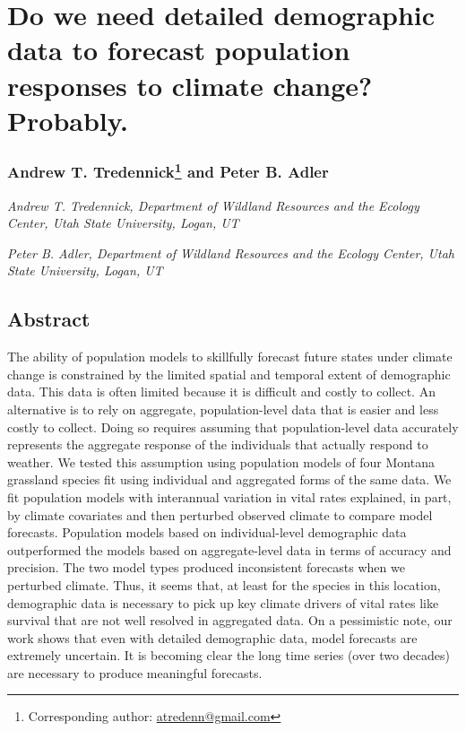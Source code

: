 \documentclass[12pt,]{article}
\author{}
\date{}
\begin{document}
\normalsize


\section{Do we need detailed demographic data to forecast population
responses to climate change?
Probably.}\label{do-we-need-detailed-demographic-data-to-forecast-population-responses-to-climate-change-probably.}

\subsubsection[Andrew T. Tredennick and Peter B. Adler]{Andrew T.
Tredennick\footnote{Corresponding author:
  \href{mailto:atredenn@gmail.com}{\href{mailto:atredenn@gmail.com}{atredenn@gmail.com}}}
and Peter B.
Adler}\label{andrew-t.-tredennickcorrauth-and-peter-b.-adler}

\emph{Andrew T. Tredennick, Department of Wildland Resources and the
Ecology Center, Utah State University, Logan, UT}

\emph{Peter B. Adler, Department of Wildland Resources and the Ecology
Center, Utah State University, Logan, UT}

\subsection{Abstract}\label{abstract}

The ability of population models to skillfully forecast future states
under climate change is constrained by the limited spatial and temporal
extent of demographic data. This data is often limited because it is
difficult and costly to collect. An alternative is to rely on aggregate,
population-level data that is easier and less costly to collect. Doing
so requires assuming that population-level data accurately represents
the aggregate response of the individuals that actually respond to
weather. We tested this assumption using population models of four
Montana grassland species fit using individual and aggregated forms of
the same data. We fit population models with interannual variation in
vital rates explained, in part, by climate covariates and then perturbed
observed climate to compare model forecasts. Population models based on
individual-level demographic data outperformed the models based on
aggregate-level data in terms of accuracy and precision. The two model
types produced inconsistent forecasts when we perturbed climate. Thus,
it seems that, at least for the species in this location, demographic
data is necessary to pick up key climate drivers of vital rates like
survival that are not well resolved in aggregated data. On a pessimistic
note, our work shows that even with detailed demographic data, model
forecasts are extremely uncertain. It is becoming clear the long time
series (over two decades) are necessary to produce meaningful forecasts.
\end{document}
